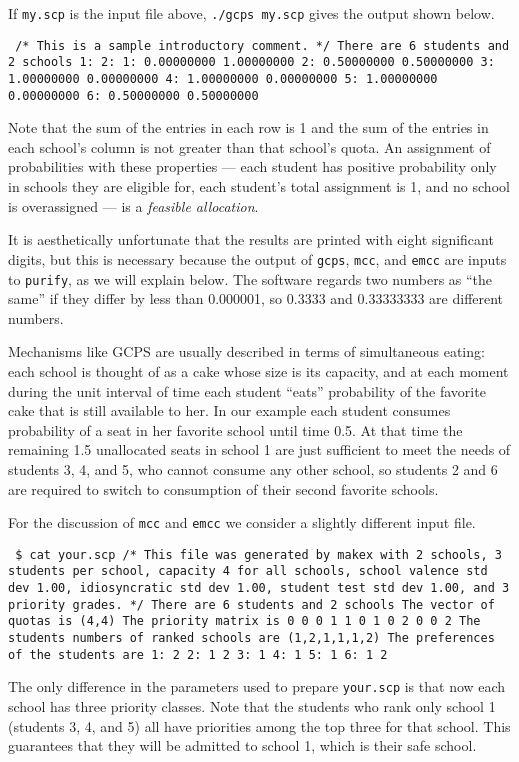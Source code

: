 \documentclass[12pt]{article}
\theoremstyle{definition}
\begin{document}
If \texttt{my.scp} is the input file above, \texttt{./gcps my.scp}
gives the output shown below.
\medskip
\begin{obeylines}\texttt{
/* This is a sample introductory comment. */
There are 6 students and 2 schools
          1:          2:
1:   0.00000000  1.00000000
2:   0.50000000  0.50000000
3:   1.00000000  0.00000000
4:   1.00000000  0.00000000
5:   1.00000000  0.00000000
6:   0.50000000  0.50000000
}
\end{obeylines} \noindent

\smallskip \noindent Note that the sum of the entries in each row is 1
and the sum of the entries in each school's column is not greater than
that school's quota.  An assignment of probabilities with these
properties --- each student has positive probability only in schools
they are eligible for, each student's total assignment is 1, and no
school is overassigned --- is a \emph{feasible allocation}.

It is aesthetically unfortunate that the results are printed with
eight significant digits, but this is necessary because the output of
\texttt{gcps}, \texttt{mcc}, and \texttt{emcc} are inputs to
\texttt{purify}, as we will explain below.  The software regards two
numbers as ``the same'' if they differ by less than 0.000001, so
0.3333 and 0.33333333 are different numbers.

Mechanisms like GCPS are usually described in terms of simultaneous
eating: each school is thought of as a cake whose size is its
capacity, and at each moment during the unit interval of time each
student ``eats'' probability of the favorite cake that is still
available to her.  In our example each student consumes probability of
a seat in her favorite school until time 0.5.  At that time the
remaining 1.5 unallocated seats in school 1 are just sufficient to
meet the needs of students 3, 4, and 5, who cannot consume any other
school, so students 2 and 6 are required to switch to consumption of
their second favorite schools.

For the discussion of \texttt{mcc} and \texttt{emcc} we consider a
slightly different input file.
\begin{obeylines}\texttt{
    \$ cat your.scp
/* This file was generated by makex with 2 schools,
3 students per school, capacity 4 for all schools,
school valence std dev 1.00, idiosyncratic std dev 1.00,
student test std dev 1.00, and 3 priority grades. */
There are 6 students and 2 schools
The vector of quotas is (4,4)
The priority matrix is
    0    0
    0    1
    1    0
    1    0
    2    0
    0    2
The students numbers of ranked schools are
(1,2,1,1,1,2)
The preferences of the students are
1:    2
2:    1   2
3:    1
4:    1
5:    1
6:    1   2
  }
\end{obeylines}
The only difference in the parameters used to prepare
\texttt{your.scp} is that now each school has three priority classes.
Note that the students who rank only school 1 (students 3, 4, and 5)
all have priorities among the top three for that school.  This
guarantees that they will be admitted to school 1, which is their safe
school.
\end{document}
